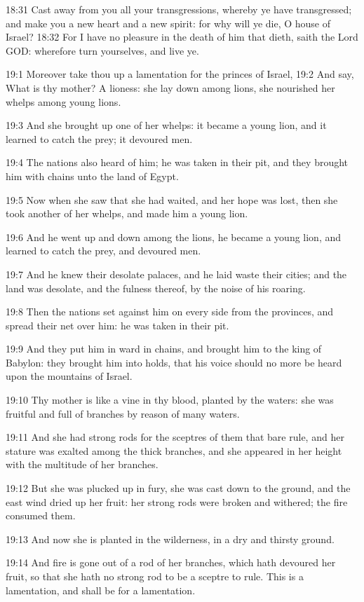 18:31 Cast away from you all your transgressions, whereby ye have
transgressed; and make you a new heart and a new spirit: for why will
ye die, O house of Israel?  18:32 For I have no pleasure in the death
of him that dieth, saith the Lord GOD: wherefore turn yourselves, and
live ye.

19:1 Moreover take thou up a lamentation for the princes of Israel,
19:2 And say, What is thy mother? A lioness: she lay down among lions,
she nourished her whelps among young lions.

19:3 And she brought up one of her whelps: it became a young lion, and
it learned to catch the prey; it devoured men.

19:4 The nations also heard of him; he was taken in their pit, and
they brought him with chains unto the land of Egypt.

19:5 Now when she saw that she had waited, and her hope was lost, then
she took another of her whelps, and made him a young lion.

19:6 And he went up and down among the lions, he became a young lion,
and learned to catch the prey, and devoured men.

19:7 And he knew their desolate palaces, and he laid waste their
cities; and the land was desolate, and the fulness thereof, by the
noise of his roaring.

19:8 Then the nations set against him on every side from the
provinces, and spread their net over him: he was taken in their pit.

19:9 And they put him in ward in chains, and brought him to the king
of Babylon: they brought him into holds, that his voice should no more
be heard upon the mountains of Israel.

19:10 Thy mother is like a vine in thy blood, planted by the waters:
she was fruitful and full of branches by reason of many waters.

19:11 And she had strong rods for the sceptres of them that bare rule,
and her stature was exalted among the thick branches, and she appeared
in her height with the multitude of her branches.

19:12 But she was plucked up in fury, she was cast down to the ground,
and the east wind dried up her fruit: her strong rods were broken and
withered; the fire consumed them.

19:13 And now she is planted in the wilderness, in a dry and thirsty
ground.

19:14 And fire is gone out of a rod of her branches, which hath
devoured her fruit, so that she hath no strong rod to be a sceptre to
rule. This is a lamentation, and shall be for a lamentation.

